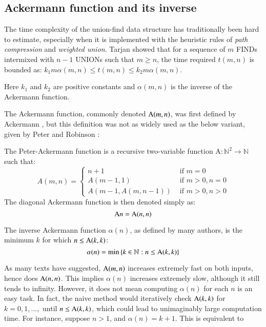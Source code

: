 \subsection{Ackermann function and its inverse}

The time complexity of the union-find data structure has traditionally
been hard to estimate, especially when it is implemented with the 
heuristic rules of \emph{path compression} and \emph{weighted union}. 
Tarjan \cite{tarjan} showed that for a sequence of $m$ FINDs intermixed with $n-1$ UNIONs 
such that $m \geq n$, the time required $t(m,n)$ is bounded
as: $k_{1}m\alpha(m,n) \leq t(m,n) \leq k_{2}m\alpha(m,n)$.

Here $k_{1}$ and $k_{2}$ are positive constants and $\alpha(m,n)$ is 
the inverse of the Ackermann function.

The Ackermann function, commonly denoted $\text{A}(m, n)$, was first defined by Ackermann \cite{ackermann}, but this definition was not as widely used as the below variant, given by Peter and Robinson \cite{peter-ackermann}:

\begin{defn} \label{defn: ack}
The Peter-Ackermann function is a recursive two-variable function $\text{A} : \mathbb{N}^2 \to \mathbb{N}$ such that:
\begin{equation}
A(m, n) = \begin{cases}
n + 1 & \text{ if } m = 0 \\
A(m-1, 1) & \text{ if } m > 0, n = 0 \\
A(m-1, A(m, n-1)) & \text{ if } m > 0, n > 0
\end{cases}
\end{equation}
The diagonal Ackermann function is then denoted simply as:
\begin{equation}
\text{A}{n} = \text{A}(n, n)
\end{equation}
\end{defn}


\begin{defn} \label{defn: inv_ack}
The inverse Ackermann function $\alpha(n)$, as defined by many authors, is the minimum $k$ for which $n \le \text{A}(k, k)$:
\begin{equation}
\alpha(n) = \min\left\{k\in \mathbb{N} : n \le \text{A}(k, k)\right\}
\end{equation}
\end{defn}

As many texts have suggested, $\text{A}(m, n)$ increases extremely fast on both inputs, hence does $\text{A}(n, n)$. This implies $\alpha(n)$ increases extremely slow, although it still tends to infinity. However, it does not mean computing $\alpha(n)$ for each $n$ is an easy task. In fact, the naive method would iteratively check $\text{A}(k, k)$ for $k = 0, 1, \ldots, $ until $n \le \text{A}(k, k)$, which could lead to unimaginably large computation time. For instance, suppose $n > 1$, and $\alpha(n) = k+1$. This is equivalent to

